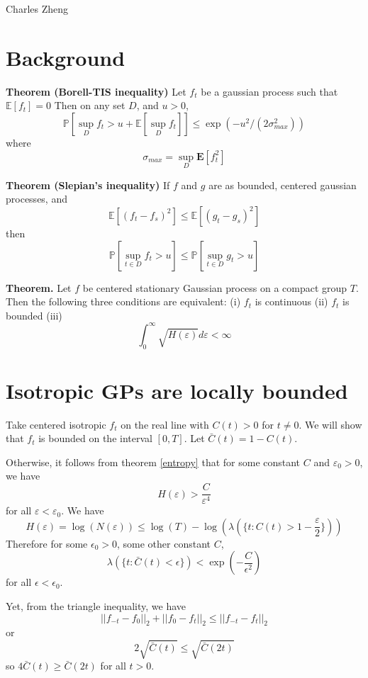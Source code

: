 \documentclass[11pt]{article}
\begin{document}
\newcommand{\tr}{\text{tr}}
\newcommand{\E}{\textbf{E}}
\newcommand{\diag}{\text{diag}}
\newcommand{\argmax}{\text{argmax}}
\newcommand{\Cov}{\text{Cov}}
\newcommand{\Var}{\text{Var}}

Charles Zheng

\section{Background}

\noindent\textbf{Theorem (Borell-TIS inequality)}
Let $f_t$ be a gaussian process such that $\mathbb{E}[f_t] = 0$
Then on any set $D$, and $u > 0$, 
\[
\mathbb{P}[\sup_D f_t > u + \mathbb{E}[\sup_D f_t]] \leq \exp(-u^2/(2\sigma_{max}^2))
\]
where
\[
\sigma_{max} = \sup_D \E[f_t^2]
\]

\noindent\textbf{Theorem (Slepian's inequality)}
If $f$ and $g$ are as bounded, centered gaussian processes, and
\[
\mathbb{E}[(f_t-f_s)^2] \leq \mathbb{E}[(g_t-g_s)^2]
\]
then
\[
\mathbb{P}[\sup_{t \in D} f_t  > u] \leq \mathbb{P}[\sup_{t \in D} g_t  > u]
\]

\noindent\textbf{Theorem.}\label{entropy} Let $f$ be centered stationary Gaussian
process on a compact group $T$. Then the following three conditions
are equivalent: (i) $f_t$ is continuous (ii) $f_t$ is bounded (iii)
\[
\int_0^\infty \sqrt{H(\varepsilon)} d\varepsilon < \infty 
\]

\section{Isotropic GPs are locally bounded}

Take centered isotropic $f_t$ on the real line with $C(t) > 0$ for $t
\neq 0$.  We will show that $f_t$ is bounded on the interval
$[0,T]$. Let $\bar{C}(t) = 1-C(t)$.

Otherwise, it follows from theorem \ref{entropy} that 
for some constant $C$ and $\varepsilon_0 > 0$, we have
\[
H(\varepsilon) > \frac{C}{\varepsilon^4}
\]
for all $\varepsilon < \varepsilon_0$.
We have
\[
H(\varepsilon) = \log(N(\varepsilon)) \leq \log(T) - \log(\lambda(\{t:
C(t) > 1-\frac{\varepsilon}{2}\}))
\]
Therefore for some $\epsilon_0 > 0$, some other constant $C$,
\[
\lambda(\{t: \bar{C}(t) < \epsilon\}) < \exp(-\frac{C}{\epsilon^2})
\]
for all $\epsilon < \epsilon_0$.

Yet, from the triangle inequality, we have
\[
||f_{-t}-f_0||_2 + ||f_0 - f_t||_2 \leq ||f_{-t}-f_{t}||_2
\]
or
\[
2\sqrt{\bar{C}(t)} \leq \sqrt{\bar{C}(2t)}
\]
so $4\bar{C}(t) \geq \bar{C}(2t)$ for all $t > 0$.
\end{document}
